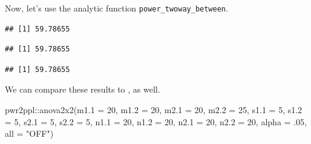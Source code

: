 \documentclass[
]{book}
\newenvironment{Shaded}{\begin{snugshade}}{\end{snugshade}}
\newcommand{\AttributeTok}[1]{\textcolor[rgb]{0.77,0.63,0.00}{#1}}
\newcommand{\CommentTok}[1]{\textcolor[rgb]{0.56,0.35,0.01}{\textit{#1}}}
\newcommand{\DecValTok}[1]{\textcolor[rgb]{0.00,0.00,0.81}{#1}}
\newcommand{\FunctionTok}[1]{\textcolor[rgb]{0.00,0.00,0.00}{#1}}
\newcommand{\NormalTok}[1]{#1}
\newcommand{\OtherTok}[1]{\textcolor[rgb]{0.56,0.35,0.01}{#1}}
\newcommand{\SpecialCharTok}[1]{\textcolor[rgb]{0.00,0.00,0.00}{#1}}
\newcommand{\StringTok}[1]{\textcolor[rgb]{0.31,0.60,0.02}{#1}}
\begin{document}
Now, let's use the analytic function \texttt{power\_twoway\_between}.

\begin{Shaded}
\end{Shaded}

\begin{verbatim}
## [1] 59.78655
\end{verbatim}

\begin{Shaded}
\end{Shaded}

\begin{verbatim}
## [1] 59.78655
\end{verbatim}

\begin{Shaded}
\end{Shaded}

\begin{verbatim}
## [1] 59.78655
\end{verbatim}

We can compare these results to \citep{R-pwr2ppl}, as well.

\begin{Shaded}
\begin{Highlighting}[]
\NormalTok{pwr2ppl}\SpecialCharTok{::}\FunctionTok{anova2x2}\NormalTok{(}\AttributeTok{m1.1 =} \DecValTok{20}\NormalTok{,}
         \AttributeTok{m1.2 =} \DecValTok{20}\NormalTok{,}
         \AttributeTok{m2.1 =} \DecValTok{20}\NormalTok{,}
         \AttributeTok{m2.2 =} \DecValTok{25}\NormalTok{,}
         \AttributeTok{s1.1 =} \DecValTok{5}\NormalTok{,}
         \AttributeTok{s1.2 =} \DecValTok{5}\NormalTok{,}
         \AttributeTok{s2.1 =} \DecValTok{5}\NormalTok{,}
         \AttributeTok{s2.2 =} \DecValTok{5}\NormalTok{,}
         \AttributeTok{n1.1 =} \DecValTok{20}\NormalTok{,}
         \AttributeTok{n1.2 =} \DecValTok{20}\NormalTok{,}
         \AttributeTok{n2.1 =} \DecValTok{20}\NormalTok{,}
         \AttributeTok{n2.2 =} \DecValTok{20}\NormalTok{,}
         \AttributeTok{alpha =}\NormalTok{ .}\DecValTok{05}\NormalTok{,}
         \AttributeTok{all =} \StringTok{"OFF"}\NormalTok{)}
\end{Highlighting}
\end{Shaded}
\end{document}
